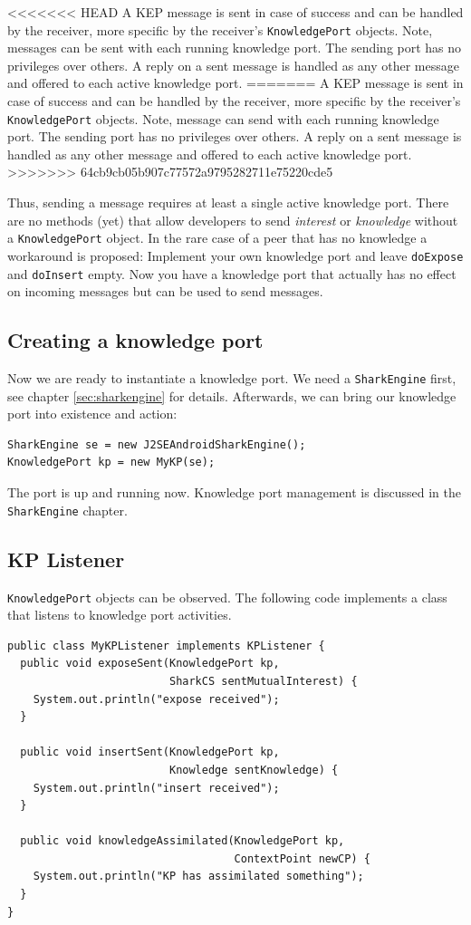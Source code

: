 <<<<<<< HEAD
A KEP message is sent in case of success and can be handled by the receiver, more specific by the receiver's {\tt KnowledgePort} objects. Note, messages can be sent with each running knowledge port. The sending port has no privileges over others. A reply on a sent message is handled as any other message and offered to each active knowledge port.
=======
A KEP message is sent in case of success and can be handled by the receiver, more specific by the receiver's {\tt KnowledgePort} objects. Note, message can send with each running knowledge port. The sending port has no privileges over others. A reply on a sent message is handled as any other message and offered to each active knowledge port.
>>>>>>> 64cb9cb05b907c77572a9795282711e75220cde5

Thus, sending a message requires at least a single active knowledge port. 
There are no methods (yet) that allow developers to send {\it interest} or {\it knowledge} without a {\tt KnowledgePort} object. In the rare case of a peer that has no knowledge a workaround is proposed: Implement your own knowledge port and leave {\tt doExpose} and {\tt doInsert} empty. Now you have a knowledge port that actually has no effect on incoming messages but can be used to send messages.

\subsection{Creating a knowledge port}
Now we are ready to instantiate a knowledge port. We need a {\tt SharkEngine} first, see chapter \ref{sec:sharkengine} for details. Afterwards, we can bring our knowledge port into existence and action:

\begin{verbatim}
SharkEngine se = new J2SEAndroidSharkEngine();
KnowledgePort kp = new MyKP(se);
\end{verbatim}

The port is up and running now. Knowledge port management is discussed in the {\tt SharkEngine} chapter.

\subsection{KP Listener}
{\tt KnowledgePort} objects can be observed. The following code implements a class that listens to knowledge port activities.

\begin{verbatim}
public class MyKPListener implements KPListener {
  public void exposeSent(KnowledgePort kp, 
                         SharkCS sentMutualInterest) {
    System.out.println("expose received");
  }

  public void insertSent(KnowledgePort kp, 
                         Knowledge sentKnowledge) {
    System.out.println("insert received");
  }

  public void knowledgeAssimilated(KnowledgePort kp, 
                                   ContextPoint newCP) {
    System.out.println("KP has assimilated something");
  }
}
\end{verbatim}

